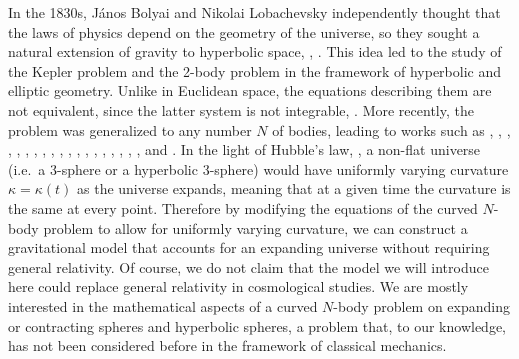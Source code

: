 \documentclass[12pt]{amsart}
\theoremstyle{definition}
\begin{document}
{In the 1830s, J\'anos Bolyai and Nikolai Lobachevsky independently thought that the laws of physics depend on the geometry of the universe, so they sought a natural extension of gravity to hyperbolic space, \cite{Bolyai}, \cite{Lobachevsky}. This idea led to the study of the Kepler problem and the 2-body problem in the framework of hyperbolic and elliptic geometry. Unlike in Euclidean space, the equations describing them are not equivalent, since the latter system is not integrable, \cite{Shchepetilov}. More recently, the problem was generalized to any number $N$ of bodies, leading to works such as \cite{Diacu}, \cite{Diacu2}, \cite {Diacu3}, \cite{Diacu5}, \cite{Diacu51}, \cite{DiacuKordlou}, \cite{Diacu6}, \cite{Diacu7}, \cite{DiacuPChavelaGRVictoria}, \cite{DiacuSanchez}, \cite{DiacuZhu}, \cite{DiacuThorn}, \cite{Garcia}, \cite{Martinez1}, \cite{PChavelaGRVictoria}, \cite{Shchepetilov}, \cite{Tibboel1}, \cite{Tibboel2}, \cite{Tibboel3}, and \cite{Zhu}. In the light of Hubble's law, \cite{Hubble}, a non-flat universe (i.e.\ a 3-sphere or a hyperbolic 3-sphere) would have uniformly varying curvature $\kappa=\kappa(t)$ as the universe expands, meaning that at a given time the curvature is the same at every point. Therefore by modifying the equations of the curved $N$-body problem to allow for uniformly varying curvature, we can construct a gravitational model that accounts for an expanding universe without requiring general relativity. Of course, we do not claim that the model we will introduce here could replace general relativity in cosmological studies. We are mostly interested in the mathematical aspects of a curved $N$-body problem on expanding or contracting spheres and hyperbolic spheres, a problem that, to our knowledge, has not been considered before in the framework of classical mechanics. 


}
\end{document}
